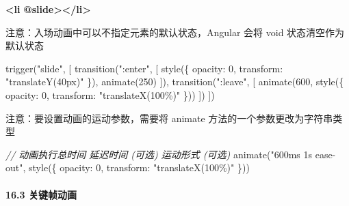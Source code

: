 \documentclass[
]{article}
\newenvironment{Shaded}{}{}
\newcommand{\CommentTok}[1]{\textcolor[rgb]{0.38,0.63,0.69}{\textit{#1}}}
\newcommand{\DataTypeTok}[1]{\textcolor[rgb]{0.56,0.13,0.00}{#1}}
\newcommand{\DecValTok}[1]{\textcolor[rgb]{0.25,0.63,0.44}{#1}}
\newcommand{\ErrorTok}[1]{\textcolor[rgb]{1.00,0.00,0.00}{\textbf{#1}}}
\newcommand{\FunctionTok}[1]{\textcolor[rgb]{0.02,0.16,0.49}{#1}}
\newcommand{\KeywordTok}[1]{\textcolor[rgb]{0.00,0.44,0.13}{\textbf{#1}}}
\newcommand{\NormalTok}[1]{#1}
\newcommand{\OperatorTok}[1]{\textcolor[rgb]{0.40,0.40,0.40}{#1}}
\newcommand{\StringTok}[1]{\textcolor[rgb]{0.25,0.44,0.63}{#1}}
\begin{document}
\begin{enumerate}
\begin{Shaded}
\begin{Highlighting}[]
\KeywordTok{\textless{}li} \ErrorTok{@slide}\KeywordTok{\textgreater{}\textless{}/li\textgreater{}}
\end{Highlighting}
\end{Shaded}

  注意：入场动画中可以不指定元素的默认状态，Angular 会将 void
  状态清空作为默认状态

\begin{Shaded}
\begin{Highlighting}[]
\FunctionTok{trigger}\NormalTok{(}\StringTok{"slide"}\OperatorTok{,}\NormalTok{ [}
  \FunctionTok{transition}\NormalTok{(}\StringTok{":enter"}\OperatorTok{,}\NormalTok{ [}
    \FunctionTok{style}\NormalTok{(\{ }\DataTypeTok{opacity}\OperatorTok{:} \DecValTok{0}\OperatorTok{,} \DataTypeTok{transform}\OperatorTok{:} \StringTok{"translateY(40px)"}\NormalTok{ \})}\OperatorTok{,}
    \FunctionTok{animate}\NormalTok{(}\DecValTok{250}\NormalTok{)}
\NormalTok{  ])}\OperatorTok{,}
  \FunctionTok{transition}\NormalTok{(}\StringTok{":leave"}\OperatorTok{,}\NormalTok{ [}
 		\FunctionTok{animate}\NormalTok{(}\DecValTok{600}\OperatorTok{,} \FunctionTok{style}\NormalTok{(\{ }\DataTypeTok{opacity}\OperatorTok{:} \DecValTok{0}\OperatorTok{,} \DataTypeTok{transform}\OperatorTok{:} \StringTok{"translateX(100\%)"}\NormalTok{ \}))}
\NormalTok{  ])}
\NormalTok{])}
\end{Highlighting}
\end{Shaded}

  注意：要设置动画的运动参数，需要将 animate
  方法的一个参数更改为字符串类型

\begin{Shaded}
\begin{Highlighting}[]
\CommentTok{// 动画执行总时间 延迟时间 (可选) 运动形式 (可选)}
\FunctionTok{animate}\NormalTok{(}\StringTok{"600ms 1s ease{-}out"}\OperatorTok{,} \FunctionTok{style}\NormalTok{(\{ }\DataTypeTok{opacity}\OperatorTok{:} \DecValTok{0}\OperatorTok{,} \DataTypeTok{transform}\OperatorTok{:} \StringTok{"translateX(100\%)"}\NormalTok{ \}))}
\end{Highlighting}
\end{Shaded}
\end{enumerate}

\hypertarget{163--ux5173ux952eux5e27ux52a8ux753b}{%
\paragraph{16.3 关键帧动画}\label{163--ux5173ux952eux5e27ux52a8ux753b}}
\end{document}
